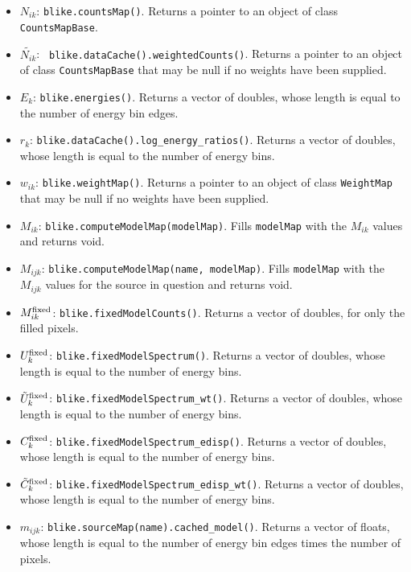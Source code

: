 \documentclass[preprint]{aastex}
\begin{document}
\begin{itemize}
\item{ {\bf $N_{ik}$}: {\tt blike.countsMap()}. Returns a pointer
    to an object of class {\tt CountsMapBase}.}
\item{ {\bf $\tilde{N_{ik}}$}: {\tt
      blike.dataCache().weightedCounts()}.  Returns a pointer to
    an object of class {\tt CountsMapBase} that may be null if no
    weights have been supplied.}
\item{ {\bf $E_k$}: {\tt blike.energies()}. Returns a vector of
    doubles, whose length is equal to the number of energy bin edges.}
\item{ {\bf $r_{k}$}: {\tt blike.dataCache().log\_energy\_ratios()}.
    Returns a vector of doubles, whose length is equal to the
    number of energy bins.}
\item{ {\bf $w_{ik}$}: {\tt blike.weightMap()}.  Returns a
    pointer to an object of class {\tt WeightMap} that may be null if
    no weights have been supplied.}
\item{ {\bf $M_{ik}$}: {\tt blike.computeModelMap(modelMap)}.  Fills
    {\tt modelMap} with the $M_{ik}$ values and returns void.}
\item{ {\bf $M_{ijk}$}: {\tt blike.computeModelMap(name,
      modelMap)}.  Fills {\tt modelMap} with the $M_{ijk}$ values
    for the source in question and returns void.}
\item{ {\bf $M_{ik}^{\rm fixed}$}: {\tt blike.fixedModelCounts()}.
    Returns a vector of doubles, for only the filled pixels.}
\item{ {\bf $U_{k}^{\rm fixed}$}: {\tt blike.fixedModelSpectrum()}.  Returns
    a vector of doubles, whose length is equal to the number of energy
    bins.}
\item{ {\bf $\tilde{U}_{k}^{\rm fixed}$}: {\tt blike.fixedModelSpectrum\_wt()}.  Returns
    a vector of doubles, whose length is equal to the number of energy
    bins.}
\item{ {\bf $C_{k}^{\rm fixed}$}: {\tt blike.fixedModelSpectrum\_edisp()}.  Returns
    a vector of doubles, whose length is equal to the number of energy
    bins.}
\item{ {\bf $\tilde{C}_{k}^{\rm fixed}$}: {\tt blike.fixedModelSpectrum\_edisp\_wt()}.  Returns
    a vector of doubles, whose length is equal to the number of energy
    bins.}
\item{ {\bf $m_{ijk}$}: {\tt blike.sourceMap(name).cached\_model()}.
    Returns a vector of floats, whose length is equal to the
    number of energy bin edges times the number of pixels.}

\end{itemize}
\end{document}
